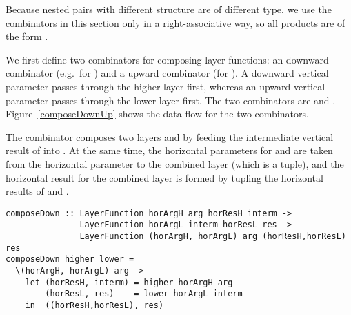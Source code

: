 \bc Because nested pairs with different structure are of different type, we use the combinators in this section only in a right-associative way, so all products are of the form . 
\ec

We first define two combinators for composing layer functions: an downward combinator (e.g.\ for ) and a upward combinator (for ). A downward vertical parameter passes through the higher layer first, whereas an upward vertical parameter passes through the lower layer first. The two combinators are  and . Figure~\ref{composeDownUp} shows the data flow for the two combinators. 

The combinator  composes two layers  and  by feeding the intermediate vertical result of  into . At the same time, the horizontal parameters for  and  are taken from the horizontal parameter to the combined layer (which is a tuple), and the horizontal result for the combined layer is formed by tupling the horizontal results of  and . 

\begin{small}
\begin{verbatim}
composeDown :: LayerFunction horArgH arg horResH interm ->
               LayerFunction horArgL interm horResL res ->
               LayerFunction (horArgH, horArgL) arg (horResH,horResL) res
composeDown higher lower = 
  \(horArgH, horArgL) arg ->                                           
    let (horResH, interm) = higher horArgH arg
        (horResL, res)    = lower horArgL interm
    in  ((horResH,horResL), res)
\end{verbatim}
\end{small}

